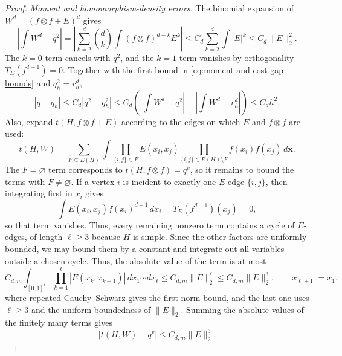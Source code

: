 \begin{proof}
\medskip
\noindent\emph{Moment and homomorphism-density errors.}
The binomial expansion of $W^d=(f\otimes f+E)^d$ gives
\begin{equation*}
  \left| \int W^d-q^2 \right|
  = \left| \sum_{k=2}^d\binom dk\int(f\otimes f)^{d-k}E^k \right|
  \le C_d\sum_{k=2}^d\int|E|^k \le C_d\|E\|_2^2.
\end{equation*}
The $k=0$ term cancels with $q^2$, and the $k=1$ term vanishes by orthogonality $T_E(f^{d-1})=0$.
Together with the first bound in \eqref{eq:moment-and-cost-gap-bounds} and $q_h^2=r_h^d$,
\[
  |q-q_h| \le C_d\left|q^2-q_h^2\right|
  \le C_d \left( \left| \int W^d-q^2 \right| + \left| \int W^d - r_h^d \right| \right)
  \le C_dh^2.
\]
Also, expand $t(H,f\otimes f+E)$ according to the edges on which $E$ and $f\otimes f$ are used:
\[
  t(H,W)=\sum_{F\subseteq E(H)}\int
  \prod_{\{i,j\}\in F}E(x_i,x_j)
  \prod_{\{i,j\}\in E(H)\setminus F}f(x_i)f(x_j)\,d\mathbf x.
\]
The $F=\varnothing$ term corresponds to $t(H,f\otimes f)=q^v$, so it remains to bound
the terms with $F\ne\varnothing$.
If a vertex $i$ is incident to exactly one $E$-edge $\{i,j\}$, then integrating
first in $x_i$ gives
\[
  \int E(x_i,x_j)f(x_i)^{d-1}\,dx_i
  =T_E(f^{d-1})(x_j)=0,
\]
so that term vanishes.  Thus, every remaining nonzero term contains a cycle of
$E$-edges, of length $\ell\ge3$ because $H$ is simple.  Since the other
factors are uniformly bounded, we may bound them by a constant and integrate
out all variables outside a chosen cycle.  Thus, the absolute value of the term
is at most
\[
  C_{d,m}\int_{[0,1]^\ell}\prod_{k=1}^\ell|E(x_k,x_{k+1})|\,dx_1\cdots dx_\ell
  \le C_{d,m}\|E\|_2^\ell\le C_{d,m}\|E\|_2^3,
  \qquad x_{\ell+1}:=x_1,
\]
where repeated Cauchy--Schwarz gives the first norm bound, and the last one
uses $\ell\ge3$ and the uniform boundedness of $\|E\|_2$.  Summing the
absolute values of the finitely many terms gives
\begin{equation*}
  |t(H,W)-q^v|\le C_{d,m}\|E\|_2^3.
\end{equation*}
\end{proof}
